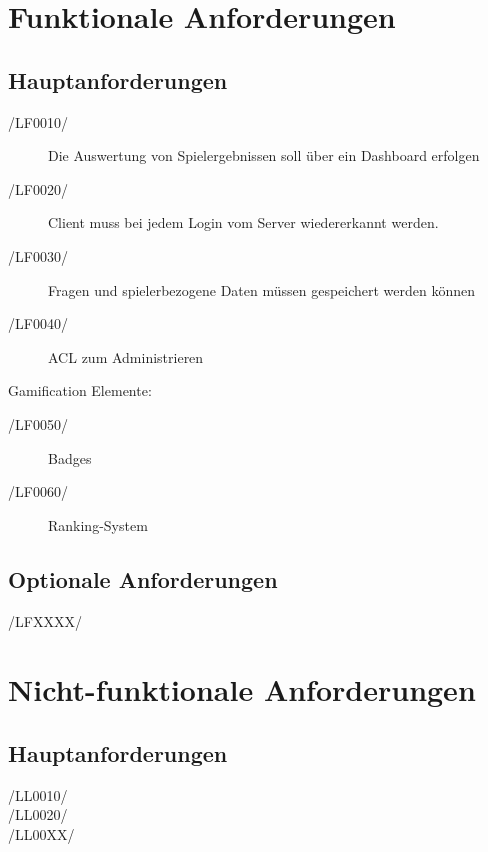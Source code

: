 \documentclass[11pt,a4paper]{scrreprt}
\begin{document}
\chapter{Funktionale Anforderungen}
\section{Hauptanforderungen}
\begin{description}
\item[/LF0010/] Die Auswertung von Spielergebnissen soll über ein Dashboard erfolgen
\item[/LF0020/] Client muss bei jedem Login vom Server wiedererkannt werden.
\item[/LF0030/] Fragen und spielerbezogene Daten müssen gespeichert werden können
\item[/LF0040/] ACL zum Administrieren
\end{description}
Gamification Elemente:
\begin{description}
\item[/LF0050/] Badges
\item[/LF0060/] Ranking-System
\end{description}
\section{Optionale Anforderungen}
\begin{description}
\item[/LFXXXX/]
\end{description}

\chapter{Nicht-funktionale Anforderungen}
\section{Hauptanforderungen}
\begin{description}
\item[/LL0010/]
\item[/LL0020/]
\item[/LL00XX/]
\end{description}
\end{document}
